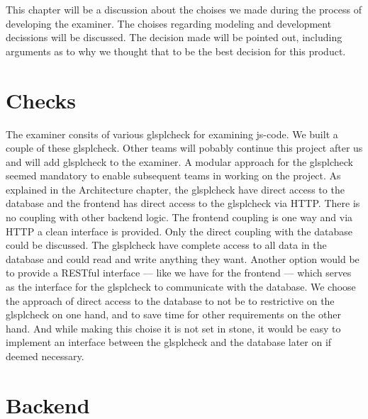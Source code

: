 %

This chapter will be a discussion about the choises we made
during the process of developing the \gls{examiner}.
The choises regarding modeling and development decissions will be discussed.
The decision made will be pointed out,
including arguments as to why we thought
that to be the best decision for this product.

\section{Checks}
The \gls{examiner} consits of various glspl{check} for examining \gls{js-code}.
We built a couple of these glspl{check}.
Other teams will pobably continue this project after us
and will add glspl{check} to the \gls{examiner}.
A modular approach for the glspl{check} seemed mandatory to enable
subsequent teams in working on the project.
As explained in the Architecture chapter,
the glspl{check} have direct access to the database
and the frontend has direct access to the glspl{check} via HTTP.
There is no coupling with other backend logic.
The frontend coupling is one way
and via HTTP a clean interface is provided.
Only the direct coupling with the database could be discussed.
The glspl{check} have complete access to all data in the database
and could read and write anything they want.
Another option would be to provide a RESTful interface ---
like we have for the frontend ---
which serves as the interface for the glspl{check} to communicate with the database.
We choose the approach of direct access to the database
to not be to restrictive on the glspl{check} on one hand,
and to save time for other requirements on the other hand.
And while making this choise it is not set in stone,
it would be easy to implement an interface
between the glspl{check} and the database later on if deemed necessary.

\section{Backend}


